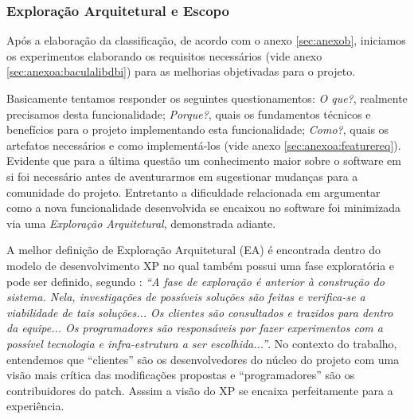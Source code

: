 %  
%

\subsubsection{Exploração Arquitetural e Escopo}\label{subsec:arquiterual}\label{subsec:experiencia}

Após a elaboração da classificação, de acordo com o anexo \ref{sec:anexob}, iniciamos os experimentos elaborando os requisitos necessários (vide anexo \ref{sec:anexoa:baculalibdbi}) para as melhorias objetivadas para o projeto.

Basicamente tentamos responder os seguintes questionamentos: \textit{O que?}, realmente precisamos desta funcionalidade; \textit{Porque?}, quais os fundamentos técnicos e benefícios para o projeto implementando esta funcionalidade; \textit{Como?}, quais os artefatos necessários e como implementá-los (vide anexo \ref{sec:anexoa:featurereq}). Evidente que para a última questão um conhecimento maior sobre o software em si foi necessário antes de aventurarmos em sugestionar mudanças para a comunidade do projeto. Entretanto a dificuldade relacionada em argumentar como a nova funcionalidade desenvolvida se encaixou no software foi minimizada via uma \textit{Exploração Arquitetural}, demonstrada adiante.

A melhor definição de Exploração Arquitetural (EA) é encontrada dentro do modelo de desenvolvimento XP no qual também possui uma fase exploratória e pode ser definido, segundo \cite[página 36]{procdesenv}: \textit{``A fase de exploração é anterior à construção do sistema. Nela, investigações de possíveis soluções são feitas e verifica-se a viabilidade de tais soluções... Os clientes são consultados e trazidos para dentro da equipe... Os programadores são responsáveis por fazer experimentos com a possível tecnologia e infra-estrutura a ser escolhida...''}. No contexto do trabalho, entendemos que ``clientes'' são os desenvolvedores do núcleo do projeto com uma visão mais crítica das modificações propostas e ``programadores'' são os contribuidores do patch. Asssim a visão do XP se encaixa perfeitamente para a experiência.

